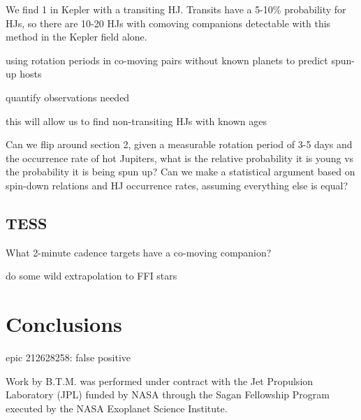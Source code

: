 \documentclass[twocolumn]{aastex62}
\begin{document}
We find 1 in Kepler with a transiting HJ. Transits have a 5-10\% probability for HJs, so there are 10-20 HJs with comoving companions detectable with this method in the Kepler field alone.

using rotation periods in co-moving pairs without known planets to predict spun-up hosts

quantify observations needed

this will allow us to find non-transiting HJs with known ages

Can we flip around section 2, given a measurable rotation period of 3-5 days and the occurrence rate of hot Jupiters, what is the relative probability it is young vs the probability it is being spun up? Can we make a statistical argument based on spin-down relations and HJ occurrence rates, assuming everything else is equal?

\subsection{TESS}

What 2-minute cadence targets have a co-moving companion?

do some wild extrapolation to FFI stars%

\section{Conclusions}


epic 212628258: false positive

\acknowledgments


Work by B.T.M. was performed under contract with the Jet Propulsion
Laboratory (JPL) funded by NASA through the Sagan Fellowship Program executed
by the NASA Exoplanet Science Institute.


 
 

\end{document}
